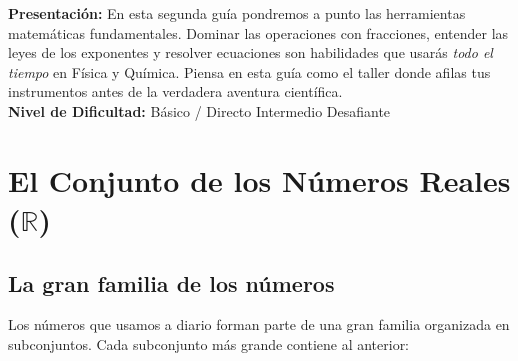 \documentclass[12pt, a4paper]{article}
\begin{document}


\vspace{4pt}
\begin{cuadroinfo}
\small
\textbf{Presentación:} En esta segunda guía pondremos a punto las herramientas matemáticas fundamentales. Dominar las operaciones con fracciones, entender las leyes de los exponentes y resolver ecuaciones son habilidades que usarás \emph{todo el tiempo} en Física y Química. Piensa en esta guía como el taller donde afilas tus instrumentos antes de la verdadera aventura científica.
\\[4pt]
\textbf{Nivel de Dificultad:}\quad
\facil{} Básico / Directo \quad
\medio{} Intermedio \quad
\dificil{} Desafiante
\end{cuadroinfo}

\vspace{8pt}

\section{El Conjunto de los Números Reales ($\mathbb{R}$)}

\subsection{La gran familia de los números}

Los números que usamos a diario forman parte de una gran familia organizada en subconjuntos. Cada subconjunto más grande contiene al anterior:
\end{document}
